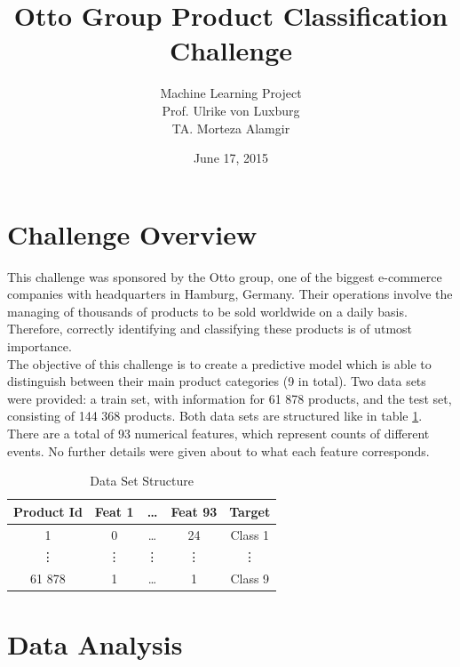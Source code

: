 \documentclass[a4paper, 12pt]{article}
\begin{document}
 
\title{Otto Group Product Classification Challenge}
\author{Machine Learning Project\\Prof. Ulrike von Luxburg\\ TA. Morteza Alamgir} 
\date{June 17, 2015}
 
\maketitle

\section*{Challenge Overview} 

	This challenge was sponsored by the Otto group, one of the biggest e-commerce companies with headquarters in Hamburg, Germany. Their operations involve the managing of thousands of products to be sold worldwide on a daily basis. Therefore, correctly identifying and classifying these products is of utmost importance. \\
The objective of this challenge is to create a predictive model which is able to distinguish between their main product categories (9 in total).
Two data sets were provided: a train set, with information for 61 878 products, and the test set, consisting of 144 368 products. Both data sets are structured like in table \ref{Tab: Struc}. There are a total of 93 numerical features, which represent counts of different events. No further details were given about to what each feature corresponds.

 \begin{table}[H]
 \centering
 \caption{Data Set Structure} \label{Tab: Struc}
 \begin{tabular}{|c |c c c| c|} 
  \hline
 Product Id & Feat 1  & \ldots & Feat 93 & Target \\ [0.5ex] 
 \hline
 1 & 0 & \ldots & 24 & Class 1\\
 \vdots & \vdots & \vdots & \vdots & \vdots\\ 
  61 878 & 1 & \ldots & 1 & Class 9\\
 [1ex] 
 \hline
\end{tabular}
 
\end{table} 

\section*{Data Analysis}
\end{document}

